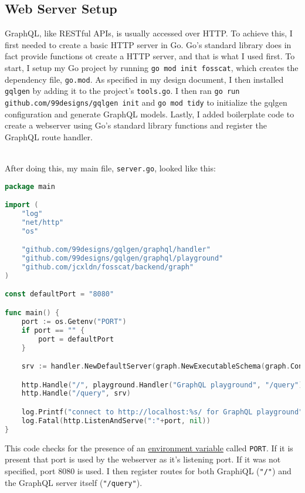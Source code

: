 \documentclass[../../main.tex]{subfiles}
\begin{document}
\subsection{Web Server Setup}

GraphQL, like RESTful APIs, is usually accessed over HTTP. To achieve this, I first needed to create a basic HTTP server in Go.
Go's standard library does in fact provide functions ot create a HTTP server, and that is what I used first.
To start, I setup my Go project by running \lstinline{go mod init fosscat}, which creates the dependency file, \lstinline{go.mod}.
As specified in my design document, I then installed \lstinline{gqlgen} by adding it to the project's \lstinline{tools.go}.
I then ran \lstinline{go run github.com/99designs/gqlgen init} and \lstinline{go mod tidy} to initialize the gqlgen configuration and generate
GraphQL models. Lastly, I added boilerplate code to create a webserver using Go's standard library functions and register the GraphQL route handler.

\noindent \\ After doing this, my main file, \lstinline{server.go}, looked like this:

\begin{lstlisting}[language=Go]
package main

import (
	"log"
	"net/http"
	"os"

	"github.com/99designs/gqlgen/graphql/handler"
	"github.com/99designs/gqlgen/graphql/playground"
	"github.com/jcxldn/fosscat/backend/graph"
)

const defaultPort = "8080"

func main() {
	port := os.Getenv("PORT")
	if port == "" {
		port = defaultPort
	}

	srv := handler.NewDefaultServer(graph.NewExecutableSchema(graph.Config{Resolvers: &graph.Resolver{}}))

	http.Handle("/", playground.Handler("GraphQL playground", "/query"))
	http.Handle("/query", srv)

	log.Printf("connect to http://localhost:%s/ for GraphQL playground", port)
	log.Fatal(http.ListenAndServe(":"+port, nil))
}

\end{lstlisting}

\noindent This code checks for the presence of an \underline{environment variable} called \lstinline{PORT}. If it is present that port is used by the webserver as it's listening port. If it was not specified, port 8080 is used.
I then register routes for both GraphiQL (\lstinline{"/"}) and the GraphQL server itself (\lstinline{"/query"}).
\end{document}

